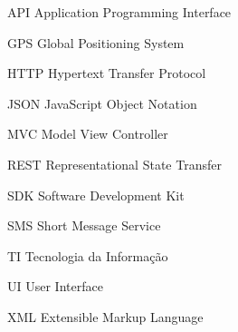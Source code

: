 
\begin{siglas}
 \item[API] Application Programming Interface
 \item[GPS] Global Positioning System
 \item[HTTP] Hypertext Transfer Protocol
 \item[JSON] JavaScript Object Notation
 \item[MVC] Model View Controller
 \item[REST] Representational State Transfer
 \item[SDK] Software Development Kit
 \item[SMS] Short Message Service
 \item[TI] Tecnologia da Informação
 \item[UI] User Interface
 \item[XML] Extensible Markup Language
\end{siglas}
